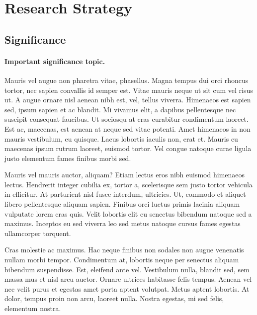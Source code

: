 \documentclass[11pt,]{article}
\title{}
\author{}
\date{}
\let\oldparagraph\paragraph
\renewcommand{\paragraph}[1]{\oldparagraph{#1}\mbox{}}
\begin{document}
\hypertarget{research-strategy}{%
\section{Research Strategy}\label{research-strategy}}

\hypertarget{significance}{%
\subsection{Significance}\label{significance}}

\hypertarget{important-significance-topic.}{%
\paragraph{Important significance
topic.}\label{important-significance-topic.}}

Mauris vel augue non pharetra vitae, phasellus. Magna tempus dui orci
rhoncus tortor, nec sapien convallis id semper est. Vitae mauris neque
ut sit cum vel risus ut. A augue ornare nisl aenean nibh est, vel,
tellus viverra. Himenaeos est sapien sed, ipsum sapien et ac blandit. Mi
vivamus elit, a dapibus pellentesque nec suscipit consequat faucibus. Ut
sociosqu at cras curabitur condimentum laoreet. Est ac, maecenas, est
aenean at neque sed vitae potenti. Amet himenaeos in non mauris
vestibulum, eu quisque. Lacus lobortis iaculis non, erat et. Mauris eu
maecenas ipsum rutrum laoreet, euismod tortor. Vel congue natoque curae
ligula justo elementum fames finibus morbi sed.

Mauris vel mauris auctor, aliquam? Etiam lectus eros nibh euismod
himenaeos lectus. Hendrerit integer cubilia ex, tortor a, scelerisque
sem justo tortor vehicula in efficitur. At parturient nisl fusce
interdum, ultricies. Ut, commodo et aliquet libero pellentesque aliquam
sapien. Finibus orci luctus primis lacinia aliquam vulputate lorem cras
quis. Velit lobortis elit eu senectus bibendum natoque sed a maximus.
Inceptos eu sed viverra leo sed metus natoque cursus fames egestas
ullamcorper torquent.

Cras molestie ac maximus. Hac neque finibus non sodales non augue
venenatis nullam morbi tempor. Condimentum at, lobortis neque per
senectus aliquam bibendum suspendisse. Est, eleifend ante vel.
Vestibulum nulla, blandit sed, sem massa mus et nisl arcu auctor. Ornare
ultrices habitasse felis tempus. Aenean vel nec velit purus et egestas
amet porta aptent volutpat. Metus aptent lobortis. At dolor, tempus
proin non arcu, laoreet nulla. Nostra egestas, mi sed felis, elementum
nostra.
\end{document}
